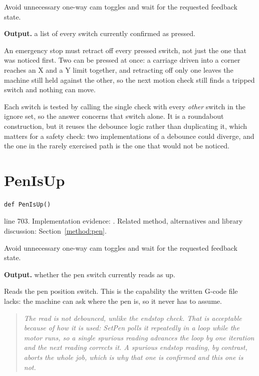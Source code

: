 Avoid unnecessary one-way cam toggles and wait for the requested feedback state.




\noindent\textbf{Output.} a list of every switch currently confirmed as pressed.


An emergency stop must retract off every pressed switch, not just the one that was noticed first. Two can be pressed at once: a carriage driven into a corner reaches an X and a Y limit together, and retracting off only one leaves the machine still held against the other, so the next motion check still finds a tripped switch and nothing can move.


Each switch is tested by calling the single check with every \emph{other} switch in the ignore set, so the answer concerns that switch alone. It is a roundabout construction, but it reuses the debounce logic rather than duplicating it, which matters for a safety check: two implementations of a debounce could diverge, and the one in the rarely exercised path is the one that would not be noticed.



\section{PenIsUp}\label{fn:reproduce:PenIsUp}
\begin{lstlisting}[style=sig]
def PenIsUp()
\end{lstlisting}
 line 703. Implementation evidence: \cite{code2026}. Related method, alternatives and library discussion: Section~\ref{method:pen}.


Avoid unnecessary one-way cam toggles and wait for the requested feedback state.




\noindent\textbf{Output.} whether the pen switch currently reads as up.


Reads the pen position switch. This is the capability the written G-code file lacks: the machine can ask where the pen is, so it never has to assume.


\begin{quote}\small\itshape The read is not debounced, unlike the endstop check. That is acceptable because of how it is used: SetPen polls it repeatedly in a loop while the motor runs, so a single spurious reading advances the loop by one iteration and the next reading corrects it. A spurious endstop reading, by contrast, aborts the whole job, which is why that one is confirmed and this one is not.\end{quote}


